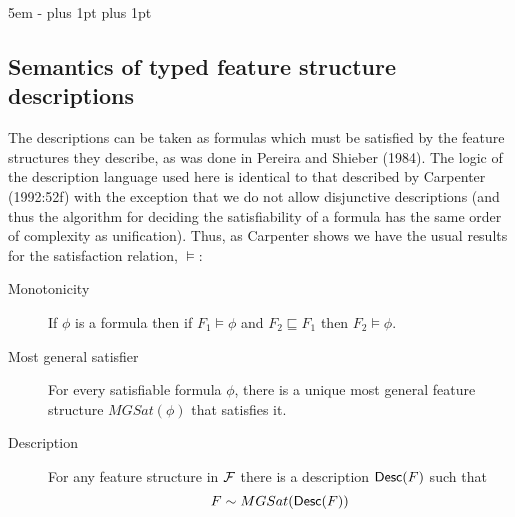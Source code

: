 \documentclass[12pt]{report}
\begin{document}
\begin{list}{}
   {\leftmargin 5em
    \itemindent -\leftmargin
    \itemsep 0pt plus 1pt
    \parsep 0pt plus 1pt}
\end{list}


\subsection{Semantics of typed feature structure descriptions}
\label{descsem}

The descriptions can be taken as formulas which must be 
satisfied by the feature structures they describe, as was done in
Pereira and Shieber (1984). 
The logic of the description language used here
is identical to that described by 
Carpenter (1992:52f) with the exception that we do not 
allow disjunctive descriptions
(and thus the algorithm for deciding the
satisfiability of a formula
has the same order of complexity as unification).
Thus, as Carpenter shows we have the usual results for the satisfaction
relation, $\models$:
\begin{description}
\item[Monotonicity]
If $\phi$ is a formula then if
$F_{1}\models\phi$ and $F_{2}\sqsubseteq F_{1}$ then $F_{2}\models 
\phi$.
\item[Most general satisfier]
For every satisfiable formula 
$\phi$, there is a unique most general feature structure $MGSat(\phi)$ that
satisfies it.
\item[Description]
For any feature structure in ${\cal F}$ 
there is a description ${\sf Desc}(F)$ such that
\[ F\sim MGSat({\sf Desc}(F))\]
\end{description}
\end{document}
